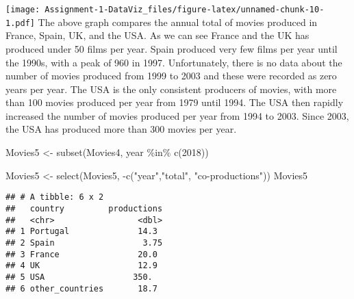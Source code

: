 \documentclass[
]{article}
\newenvironment{Shaded}{\begin{snugshade}}{\end{snugshade}}
\newcommand{\DecValTok}[1]{\textcolor[rgb]{0.00,0.00,0.81}{#1}}
\newcommand{\FunctionTok}[1]{\textcolor[rgb]{0.00,0.00,0.00}{#1}}
\newcommand{\NormalTok}[1]{#1}
\newcommand{\OtherTok}[1]{\textcolor[rgb]{0.56,0.35,0.01}{#1}}
\newcommand{\SpecialCharTok}[1]{\textcolor[rgb]{0.00,0.00,0.00}{#1}}
\newcommand{\StringTok}[1]{\textcolor[rgb]{0.31,0.60,0.02}{#1}}
\begin{document}
\texttt{[image: Assignment-1-DataViz\_files/figure-latex/unnamed-chunk-10-1.pdf]}
The above graph compares the annual total of movies produced in France,
Spain, UK, and the USA. As we can see France and the UK has produced
under 50 films per year. Spain produced very few films per year until
the 1990s, with a peak of 960 in 1997. Unfortunately, there is no data
about the number of movies produced from 1999 to 2003 and these were
recorded as zero years per year. The USA is the only consistent
producers of movies, with more than 100 movies produced per year from
1979 until 1994. The USA then rapidly increased the number of movies
produced per year from 1994 to 2003. Since 2003, the USA has produced
more than 300 movies per year.

\begin{Shaded}
\begin{Highlighting}[]
\NormalTok{Movies5 }\OtherTok{\textless{}{-}} \FunctionTok{subset}\NormalTok{(Movies4, year }\SpecialCharTok{\%in\%} \FunctionTok{c}\NormalTok{(}\DecValTok{2018}\NormalTok{))}

\NormalTok{Movies5 }\OtherTok{\textless{}{-}} \FunctionTok{select}\NormalTok{(Movies5, }\SpecialCharTok{{-}}\FunctionTok{c}\NormalTok{(}\StringTok{"year"}\NormalTok{,}\StringTok{"total"}\NormalTok{, }\StringTok{"co{-}productions"}\NormalTok{))}
\NormalTok{Movies5}
\end{Highlighting}
\end{Shaded}

\begin{verbatim}
## # A tibble: 6 x 2
##   country         productions
##   <chr>                 <dbl>
## 1 Portugal              14.3 
## 2 Spain                  3.75
## 3 France                20.0 
## 4 UK                    12.9 
## 5 USA                  350.  
## 6 other_countries       18.7
\end{verbatim}

\begin{Shaded}
\end{Shaded}
\end{document}
